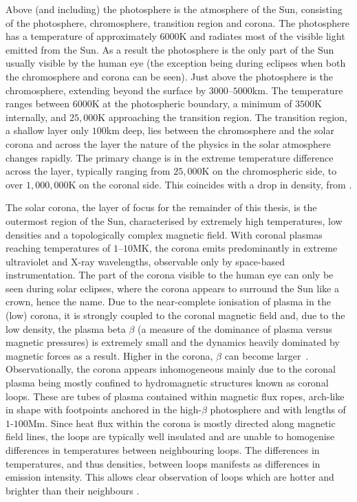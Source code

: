 Above (and including) the photosphere is the atmosphere of the Sun, consisting of the photosphere, chromosphere, transition region and corona. The photosphere has a temperature of approximately $6000$K and radiates most of the visible light emitted from the Sun. As a result the photosphere is the only part of the Sun usually visible by the human eye (the exception being during eclipses when both the chromosphere and corona can be seen). Just above the photosphere is the chromosphere, extending beyond the surface by $3000$--$5000$km. The temperature ranges between $6000$K at the photospheric boundary, a minimum of $3500$K internally, and $25,000$K approaching the transition region. The transition region, a shallow layer only $100$km deep, lies between the chromosphere and the solar corona and across the layer the nature of the physics in the solar atmosphere changes rapidly. The primary change is in the extreme temperature difference across the layer, typically ranging from $25,000$K on the chromospheric side, to over $1,000,000$K on the coronal side. This coincides with a drop in density, from .

The solar corona, the layer of focus for the remainder of this thesis, is the outermost region of the Sun, characterised by extremely high temperatures, low densities and a topologically complex magnetic field. With coronal plasmas reaching temperatures of $1$--$10$MK, the corona emits predominantly in extreme ultraviolet and X-ray wavelengths, observable only by space-based instrumentation. The part of the corona visible to the human eye can only be seen during solar eclipses, where the corona appears to surround the Sun like a crown, hence the name. Due to the near-complete ionisation of plasma in the (low) corona, it is strongly coupled to the coronal magnetic field and, due to the low density, the plasma beta $\beta$ (a measure of the dominance of plasma versus magnetic pressures) is extremely small and the dynamics heavily dominated by magnetic forces as a result. Higher in the corona, $\beta$ can become larger~\cite{gomezPlasmaUpbetaEvolution2019}. Observationally, the corona appears inhomogeneous mainly due to the coronal plasma being mostly confined to hydromagnetic structures known as coronal loops. These are tubes of plasma contained within magnetic flux ropes, arch-like in shape with footpoints anchored in the high-$\beta$ photosphere and with lengths of $1$-$100$Mm. Since heat flux within the corona is mostly directed along magnetic field lines, the loops are typically well insulated and are unable to homogenise differences in temperatures between neighbouring loops. The differences in temperatures, and thus densities, between loops manifests as differences in emission intensity. This allows clear observation of loops which are hotter and brighter than their neighbours .

